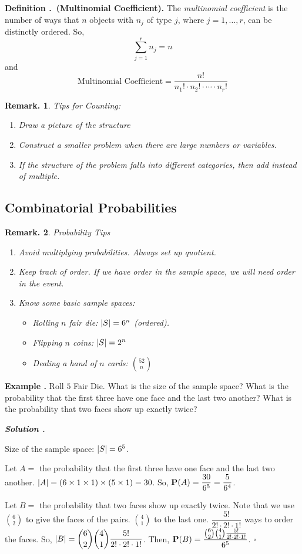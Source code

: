 \documentclass[12pt, a4paper]{article}
\newcounter{index}[subsection]
\newenvironment*{df}[1]{\par\noindent\textbf{Definition \thesubsection.\stepcounter{index}\theindex\ (#1).}}{\par}
\newenvironment*{eg}{\begin{framed}\par\noindent\textbf{Example \thesubsection.\stepcounter{index}\theindex}}{\par\end{framed}}
\newcounter{nprf}[subsection]
\newenvironment*{sol}{\par\indent\textbf{\textit{Solution \stepcounter{nprf}\thenprf.}}\par}{\hfill{$\square$}\par}
\newtheorem*{rmk}{Remark.}
\def\dsst{\displaystyle}
\def\P{\vb{P}}
\begin{document}
\begin{df}{Multinomial Coefficient}
	The \textit{multinomial coefficient} is the number of ways that $n$ objects with $n_j$ of type $j$, where $j=1,\dots,r$, can be distinctly ordered. So, \[\sum_{j=1}^rn_j=n\] and \[\text{Multinomial Coefficient}=\dfrac{n!}{n_1!\cdot n_2!\cdot\cdots\cdot n_r!}\]
\end{df}
\begin{rmk}
	Tips for Counting:
	\begin{enumerate}
		\item Draw a picture of the structure
		\item Construct a smaller problem when there are large numbers or variables.
		\item If the structure of the problem falls into different categories, then add instead of multiple. 
	\end{enumerate}	
\end{rmk}

\subsection{Combinatorial Probabilities}
\begin{rmk}
	Probability Tips
	\begin{enumerate}
		\item Avoid multiplying probabilities. Always set up quotient.
		\item Keep track of order. If we have order in the sample space, we will need order in the event.
		\item Know some basic sample spaces:
		\begin{itemize}
			\item Rolling $n$ fair die: $\qty|S|=6^n$ (ordered).
			\item Flipping $n$ coins: $\qty|S|=2^n$
			\item Dealing a hand of $n$ cards: $\dsst\binom{52}{n}$
		\end{itemize}
	\end{enumerate}	
\end{rmk}
\begin{eg}{}
	Roll $5$ Fair Die. What is the size of the sample space? What is the probability that the first three have one face and the last two another? What is the probability that two faces show up exactly twice? 
	\begin{sol}
		\par Size of the sample space: $\qty|S|=6^5$.
		\par Let $A=$ the probability that the first three have one face and the last two another. $\qty|A|=(6\times1\times1)\times(5\times1)=30$. So, $\P(A)=\dfrac{30}{6^5}=\dfrac{5}{6^4}$.
		\par Let $B=$ the probability that two faces show up exactly twice. Note that we use $\dsst\binom{6}{2}$ to give the faces of the pairs. $\dsst\binom{4}{1}$ to the last one. $\dfrac{5!}{2!\cdot2!\cdot1!}$ ways to order the faces. So, $\qty|B|=\dsst\binom{6}{2}\binom{4}{1}\dfrac{5!}{2!\cdot2!\cdot1!}$. Then, $\P(B)=\dfrac{\binom{6}{2}\binom{4}{1}\frac{5!}{2!\cdot2!\cdot1!}}{6^5}$.
	\end{sol}
\end{eg}
\end{document}
